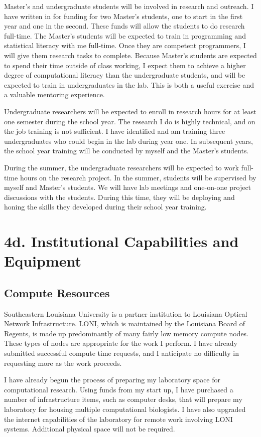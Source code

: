 \documentclass[12pt]{article}
\begin{document}
Master's  and undergraduate students will be involved in research and outreach.
I have written in for funding for two Master's students, one to start in the first year and one in the second.
These funds will allow the students to do research full-time. 
The Master's students will be expected to train in programming and statistical literacy with me full-time.
Once they are competent programmers, I will give them research tasks to complete. 
Because Master's students are expected to spend their time outside of class working, I expect them to achieve a higher degree of computational literacy than the undergraduate students, and will be expected to train in undergraduates in the lab.
This is both a useful exercise and a valuable mentoring  experience. \par
Undergraduate researchers will be expected to enroll in research hours for at least one semester during the  school year.
The research I do is highly technical, and on the job training is not sufficient.
I have identified and am training three undergraduates who could begin in the lab during year one.
In subsequent years, the school year training will be conducted by myself and the Master's students. \par
During the summer, the undergraduate researchers will be expected to work full-time hours on the research project.
In the summer, students will be supervised by myself and Master's students.
We will have lab meetings and one-on-one project discussions with the students.
During this time, they will be deploying and honing the skills they developed during their school year training. \par
	
\section*{4d. Institutional Capabilities and Equipment}
\subsection*{Compute Resources}

Southeastern Louisiana University is a partner institution to Louisiana Optical Network Infrastructure.
LONI, which is maintained by the Louisiana Board of Regents, is made up predominantly of many fairly low memory compute nodes.
These types of nodes are appropriate for the work I perform.
I have already submitted successful compute time requests, and I anticipate no difficulty in requesting more as the work proceeds. \par
I have already begun the process of preparing my laboratory space for computational research.
Using funds from my start up, I have purchased a number of infrastructure items, such as computer desks, that will prepare my laboratory for housing multiple computational biologists.
I have also upgraded the internet capabilities of the laboratory for remote work involving LONI systems.
Additional physical space will not be required. \par
\end{document}
